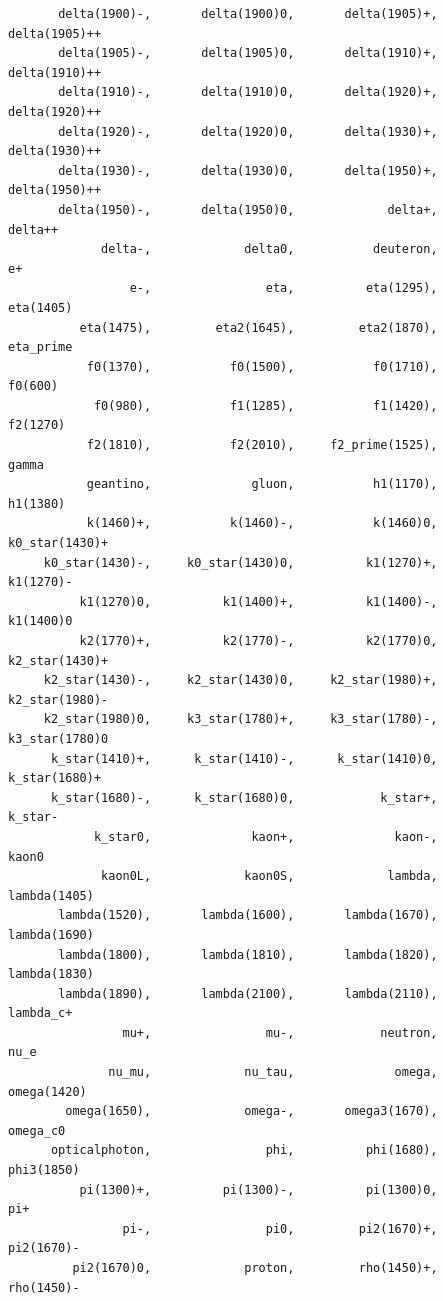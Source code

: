 \documentclass[a4paper,12pt]{article}
\begin{document}
\begin{verbatim}
       delta(1900)-,       delta(1900)0,       delta(1905)+,      delta(1905)++
       delta(1905)-,       delta(1905)0,       delta(1910)+,      delta(1910)++
       delta(1910)-,       delta(1910)0,       delta(1920)+,      delta(1920)++
       delta(1920)-,       delta(1920)0,       delta(1930)+,      delta(1930)++
       delta(1930)-,       delta(1930)0,       delta(1950)+,      delta(1950)++
       delta(1950)-,       delta(1950)0,             delta+,            delta++
             delta-,             delta0,           deuteron,                 e+
                 e-,                eta,          eta(1295),          eta(1405)
          eta(1475),         eta2(1645),         eta2(1870),          eta_prime
           f0(1370),           f0(1500),           f0(1710),            f0(600)
            f0(980),           f1(1285),           f1(1420),           f2(1270)
           f2(1810),           f2(2010),     f2_prime(1525),              gamma
           geantino,              gluon,           h1(1170),           h1(1380)
           k(1460)+,           k(1460)-,           k(1460)0,     k0_star(1430)+
     k0_star(1430)-,     k0_star(1430)0,          k1(1270)+,          k1(1270)-
          k1(1270)0,          k1(1400)+,          k1(1400)-,          k1(1400)0
          k2(1770)+,          k2(1770)-,          k2(1770)0,     k2_star(1430)+
     k2_star(1430)-,     k2_star(1430)0,     k2_star(1980)+,     k2_star(1980)-
     k2_star(1980)0,     k3_star(1780)+,     k3_star(1780)-,     k3_star(1780)0
      k_star(1410)+,      k_star(1410)-,      k_star(1410)0,      k_star(1680)+
      k_star(1680)-,      k_star(1680)0,            k_star+,            k_star-
            k_star0,              kaon+,              kaon-,              kaon0
             kaon0L,             kaon0S,             lambda,       lambda(1405)
       lambda(1520),       lambda(1600),       lambda(1670),       lambda(1690)
       lambda(1800),       lambda(1810),       lambda(1820),       lambda(1830)
       lambda(1890),       lambda(2100),       lambda(2110),          lambda_c+
                mu+,                mu-,            neutron,               nu_e
              nu_mu,             nu_tau,              omega,        omega(1420)
        omega(1650),             omega-,       omega3(1670),           omega_c0
      opticalphoton,                phi,          phi(1680),         phi3(1850)
          pi(1300)+,          pi(1300)-,          pi(1300)0,                pi+
                pi-,                pi0,         pi2(1670)+,         pi2(1670)-
         pi2(1670)0,             proton,         rho(1450)+,         rho(1450)-

\end{verbatim}
\end{document}
